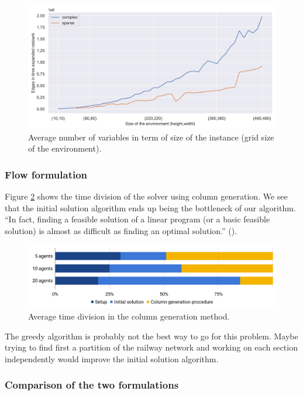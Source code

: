 \documentclass[14pt,a4paper]{article}
\theoremstyle{definition}
\numberwithin{equation}{subsection}
\begin{document}
\begin{figure}[h]
	\centering
	\includegraphics[width=\linewidth]{img/number_variables.jpg}
	\caption{Average number of variables in term of size of the instance (grid size of the environment).}
	\label{fig:numberVar}
\end{figure}

\subsubsection{Flow formulation}

Figure \ref{fig:time repartition} shows the time division of the solver using column generation. We see that the initial solution algorithm ends up being the bottleneck of our algorithm. \enquote{In fact, finding a feasible solution of a linear program (or a basic feasible solution) is almost as difficult as finding an optimal solution.} (\cite{networkflows}).


\begin{figure}[h]
	\centering
	\includegraphics[width=\linewidth]{img/time_repartition.png}
	\caption{Average time division in the column generation method.}
	\label{fig:time repartition}
\end{figure}

The greedy algorithm is probably not the best way to go for this problem. Maybe trying to find first a partition of the railway network and working on each section independently would improve the initial solution algorithm.

\subsubsection{Comparison of the two formulations}
\end{document}
